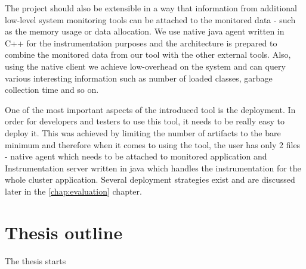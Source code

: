 The project should also be extensible in a way that information from additional low-level system monitoring tools can be attached to the monitored data - such as the memory usage or data allocation. We use  native java agent written in C++ for the instrumentation purposes and the architecture is prepared to combine the monitored data from our tool with the other external tools.  Also, using the native client we achieve low-overhead on the system and can query various interesting information such as number of loaded classes, garbage collection time and so on. 

One of the most important aspects of the introduced tool is the deployment. In order for developers and testers to use this tool, it needs to be really easy to deploy it. This was achieved by limiting the number of artifacts to the bare minimum and therefore when it comes to using the tool, the user has only 2 files - native agent which needs to be attached to monitored application and Instrumentation server written in java which handles the instrumentation for the whole cluster application. Several deployment strategies exist and are discussed later in the \ref{chap:evaluation} chapter.

\section{Thesis outline}
The thesis starts 

